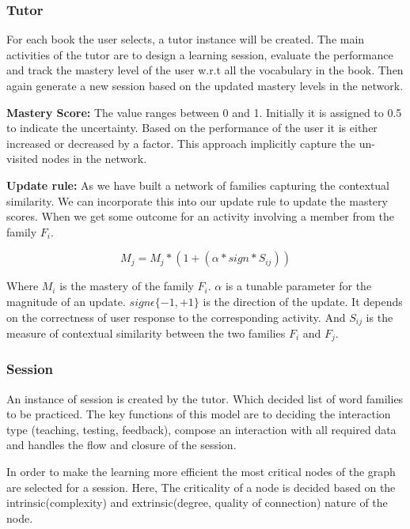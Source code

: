 \documentclass[11pt,a4paper]{article}
\begin{document}
\subsubsection{Tutor}
For each book the user selects, a tutor instance will be created. The main
activities of the tutor are to design a learning session, evaluate the
performance and track the mastery level of the user w.r.t all the vocabulary
in the book. Then again generate a new session based on the updated mastery
levels in the network.

\textbf{Mastery Score:} The value ranges between 0 and 1. Initially it is
assigned to 0.5 to indicate the uncertainty. Based on the performance of the
user it is either increased or decreased by a factor. This approach implicitly
capture the un-visited nodes in the network.

\textbf{Update rule:} As we have built a network of families capturing the
contextual similarity. We can incorporate this into our update rule to update
the mastery scores. When we get some outcome for an activity involving a member
from the family ${F_i}$.

\begin{equation}
  M_j = M_j * (1 + (\alpha * sign * S_{ij}))
\end{equation}

Where ${M_i}$ is the mastery of the family ${F_i}$. ${\alpha}$ is a tunable parameter
for the magnitude of an update. ${sign \epsilon \{-1, +1\}}$ is the direction 
of the update. It depends on the correctness of user response to the corresponding
activity. And ${S_{ij}}$ is the measure of contextual similarity between the two
families ${F_i}$ and ${F_j}$.

\subsubsection{Session}
An instance of session is created by the tutor. Which decided list of word
families to be practiced. The key functions of this model are to deciding the
interaction type (teaching, testing, feedback), compose an interaction with all
required data and handles the flow and closure of the session.

In order to make the learning more efficient the most critical nodes of the
graph are selected for a session. Here, The criticality of a node is decided
based on the intrinsic(complexity) and extrinsic(degree, quality of connection)
nature of the node.
\end{document}
